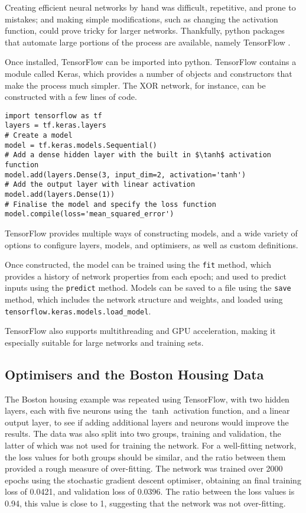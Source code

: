 Creating efficient neural networks by hand was difficult, repetitive, and prone
to mistakes; and making simple modifications, such as changing the activation
function, could prove tricky for larger networks.
Thankfully, python packages that automate large portions of the process are
available, namely TensorFlow \citep{Abadi:2016:Tensorflow}.

Once installed, TensorFlow can be imported into python.
TensorFlow contains a module called Keras, which provides a number of objects
and constructors that make the process much simpler.
The XOR network, for instance, can be constructed with a few lines of code.
\begin{verbatim}
import tensorflow as tf
layers = tf.keras.layers
# Create a model
model = tf.keras.models.Sequential()
# Add a dense hidden layer with the built in $\tanh$ activation function
model.add(layers.Dense(3, input_dim=2, activation='tanh')
# Add the output layer with linear activation
model.add(layers.Dense(1))
# Finalise the model and specify the loss function
model.compile(loss='mean_squared_error')
\end{verbatim}
TensorFlow provides multiple ways of constructing models, and a wide variety of
options to configure layers, models, and optimisers, as well as custom
definitions.

Once constructed, the model can be trained using the \texttt{fit} method, which
provides a history of network properties from each epoch; and used to predict
inputs using the \texttt{predict} method.
Models can be saved to a file using the \texttt{save} method, which includes the
network structure and weights, and loaded using
\texttt{tensorflow.keras.models.load\_model}.

TensorFlow also supports multithreading and GPU acceleration, making it
especially suitable for large networks and training sets.



\subsection{Optimisers and the Boston Housing Data}

The Boston housing example was repeated using TensorFlow, with two hidden
layers, each with five neurons using the $\tanh$ activation function, and a
linear output layer, to see if adding additional layers and neurons would
improve the results.
The data was also split into two groups, training and validation, the latter of
which was not used for training the network.
For a well-fitting network, the loss values for both groups should be similar,
and the ratio between them provided a rough measure of over-fitting.
The network was trained over 2000 epochs using the stochastic gradient descent
optimiser, obtaining an final training loss of 0.0421, and validation loss of
0.0396.
The ratio between the loss values is 0.94, this value is close to 1,
suggesting that the network was not over-fitting.

